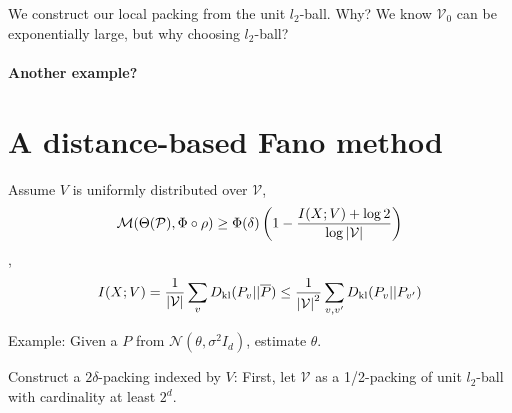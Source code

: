 \documentclass[11pt,a4paper]{article}
\begin{document}
{\blue We construct our local packing from the unit $l_2$-ball. Why? We know $\mathcal{V}_0$ can be exponentially large, but why choosing $l_2$-ball? }

\paragraph{Another example?} 

\section{A distance-based Fano method} 

\begin{lemma}
    Assume $V$ is uniformly distributed over $\mathcal{V}$,
    \[
    \mathcal{M}(\Theta(\mathcal{P}), \Phi \circ \rho) \geq \Phi(\delta) \left( 1 - \dfrac{I(X; V) + \log 2}{\log \left\lvert\mathcal{V}\right\rvert} \right)
    \] ,
    \[
    I(X;V)= \dfrac{1}{\left\lvert\mathcal{V}\right\rvert} \sum_{v} D_{{\rm kl}}(P_v || \overline{P}) \leq \dfrac{1}{\left\lvert\mathcal{V}\right\rvert^2} \sum_{v, v'} D_{\rm kl} (P_v || P_{v'})
    \] 
\end{lemma}

Example: Given a $P$ from  $\mathcal{N}(\theta, \sigma^2 I_d)$, estimate $\theta$.

Construct a $2\delta$-packing indexed by $V$: First, let  $\mathcal{V}$ as a 1/2-packing of unit $l_2$-ball with cardinality at least  $2^{d}$.
\end{document}

